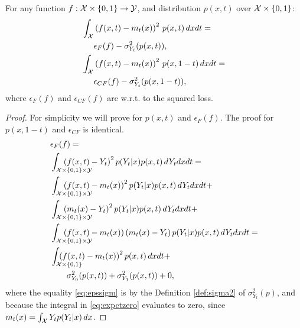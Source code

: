 \begin{thmapplem}\label{lem:epsmloss}
For any function $f : \mathcal X \times \{0,1\} \rightarrow \mathcal Y$, and distribution $p(x,t)$ over $\mathcal X \times \{0,1\}$:
\begin{align*}
\int_\mathcal X& \left(f(x,t) - m_t(x) \right)^2 \, p(x,t) \, dx dt = \\
&\epsilon_F(f) - \sigma^2_{Y_t}(p(x,t)), \\
 \int_\mathcal X &\left(f(x,t) - m_t(x) \right)^2 \, p(x,1-t) \, dx dt = \\
& \epsilon_{CF}(f) - \sigma^2_{Y_t}(p(x,1-t)),
\end{align*}
where $\epsilon_F(f)$ and $\epsilon_{CF}(f)$ are w.r.t. to the squared loss.
\end{thmapplem}
\begin{proof}
For simplicity we will prove for $p(x,t)$ and $\epsilon_F(f)$. The proof for $p(x,1-t)$ and $\epsilon_{CF}$ is identical.
\begin{align}
&\epsilon_F(f) = \nonumber \\
&\int_{\cX  \times \{0,1\} \times \cY}   \!\!\!\!\!\!\!\!\!\!\!\!\!\!\!\!\!\!\!\!\!\! \left(f(x,t) - Y_t\right)^2 p(Y_t|x) p(x,t) \, dY_t dx dt = \nonumber \\
&\int_{\cX  \times \{0,1\} \times \cY}   \!\!\!\!\!\!\!\!\!\!\!\!\!\!\!\!\!\!\!\!\!\! \left(f(x,t) - m_t(x)\right)^2 p(Y_t|x) p(x,t) \, dY_t dx dt + \nonumber \\
&\int_{\cX  \times \{0,1\} \times \cY}   \!\!\!\!\!\!\!\!\!\!\!\!\!\!\!\!\!\!\!\!\!\!  \left(m_t(x) - Y_t\right)^2 p(Y_t|x) p(x,t) \, dY_t dx dt + \label{eq:expctzero} \\
&\int_{\cX  \times \{0,1\} \times \cY}  \!\!\!\!\!\!\!\!\!\!\!\!\!\!\!\!\!\!\!\!\!\! \left(f(x,t) - m_t(x)\right)\left(m_t(x) - Y_t\right) p(Y_t|x) p(x,t) \, dY_t dx dt = \label{eq:epssigm} \\
&\int_{\cX  \times \{0,1\} }   \!\!\!\!\!\!\!\!\!\!\!\!\!\!\!\!\!\! \left(f(x,t) - m_t(x)\right)^2  p(x,t) \,  dx dt + \nonumber \\
&\quad \quad \sigma^2_{Y_0}(p(x,t)) + \sigma^2_{Y_1}(p(x,t)) +0 , \nonumber
\end{align}
where the equality \eqref{eq:epssigm} is by the Definition \ref{def:sigma2} of $\sigma^2_{Y_t}(p)$, and because the integral in \eqref{eq:expctzero} evaluates to zero, since $m_t(x) = \int_\mathcal X Y_t p(Y_t|x) \, dx$.
\end{proof}

